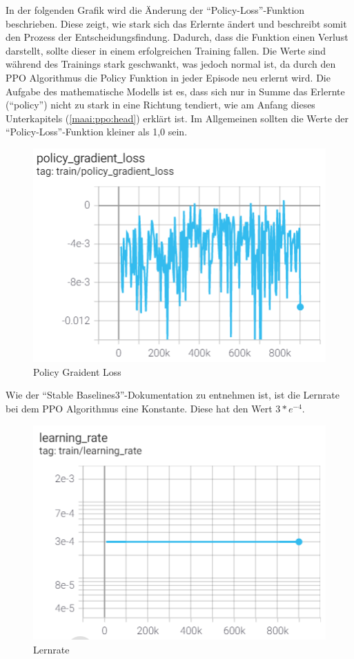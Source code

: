 In der folgenden Grafik wird die Änderung der ``Policy-Loss''-Funktion beschrieben.
Diese zeigt, wie stark sich das Erlernte ändert und beschreibt somit den Prozess der Entscheidungsfindung.
Dadurch, dass die Funktion einen Verlust darstellt, sollte dieser in einem erfolgreichen Training fallen.
Die Werte sind während des Trainings stark geschwankt, was jedoch normal ist,
da durch den PPO Algorithmus die Policy Funktion in jeder Episode neu erlernt wird.
Die Aufgabe des mathematische Modells ist es, dass sich nur in Summe das Erlernte (``policy'') nicht zu stark in eine Richtung tendiert, wie am Anfang dieses Unterkapitels (\ref{maai:ppo:head}) erklärt ist.
Im Allgemeinen sollten die Werte der ``Policy-Loss''-Funktion kleiner als 1,0 sein.

\begin{figure}[H]
    \centering
    \includegraphics[scale=0.7]{pics/Tensorboard/PPO/policy_loss_new.png}
    \caption{Policy Graident Loss}
    \label{fig:ppo:pgl}
\end{figure}

Wie der ``Stable Baselines3''-Dokumentation %
zu entnehmen ist, ist die Lernrate bei dem PPO Algorithmus eine Konstante.
Diese hat den Wert \(3*e^{-4}\).

\begin{figure}[H]
    \centering
    \includegraphics[scale=0.7]{pics/Tensorboard/PPO/learning_rate_new.png}
    \caption{Lernrate}
    \label{fig:ppo:learningrate}
\end{figure}

